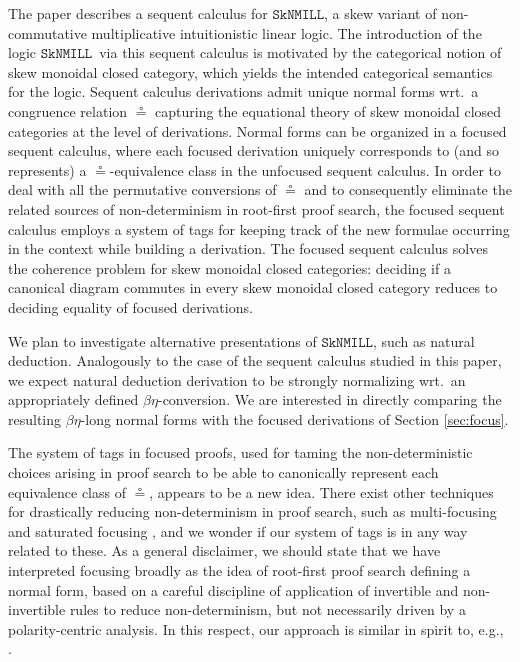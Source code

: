 \documentclass[copyright,creativecommons]{eptcs}
\theoremstyle{definition}
\newcommand{\SkNMILL}{$\mathtt{SkNMILL}$}
\begin{document}
The paper describes a sequent calculus for \SkNMILL, a skew variant of non-commutative multiplicative intuitionistic linear logic. The introduction of the logic \SkNMILL\ via this sequent calculus is motivated by the categorical notion of skew monoidal closed category, which yields the intended categorical semantics for the logic. Sequent calculus derivations admit unique normal forms wrt.\ a congruence relation $\circeq$ capturing the equational theory of skew monoidal closed categories at the level of derivations. Normal forms can be organized in a focused sequent calculus, where each focused derivation uniquely corresponds to (and so represents) a $\circeq$-equivalence class in the unfocused sequent calculus. In order to deal with all the permutative conversions of $\circeq$ and to consequently eliminate the related sources of non-determinism in root-first proof search, the focused sequent calculus employs a system of tags for keeping track of the new formulae occurring in the context while building a derivation. The focused sequent calculus solves the coherence problem for skew monoidal closed categories: deciding if a canonical diagram commutes in every skew monoidal closed category reduces to deciding equality of focused derivations.

We plan to investigate alternative presentations of \SkNMILL, such as natural deduction. Analogously to the case of the sequent calculus studied in this paper, we expect natural deduction derivation to be strongly normalizing wrt.\ an appropriately defined $\beta\!\eta$-conversion. We are interested in directly comparing the resulting $\beta\!\eta$-long normal forms with the focused derivations of Section \ref{sec:focus}.

The system of tags in focused proofs, used for taming the non-deterministic choices arising in proof search to be able to canonically represent each equivalence class of $\circeq$, appears to be a new idea. %
There exist other techniques for drastically reducing non-determinism in proof search, such as multi-focusing \cite{chaudhuri:canonical:2008} and saturated focusing \cite{scherer:simple:2015}, and we wonder if our system of tags is in any way related to these. As a general disclaimer, we should state that we have interpreted focusing broadly as the idea of root-first proof search defining a normal form, based on a careful discipline of application of invertible and non-invertible rules to reduce non-determinism, but not necessarily driven by a polarity-centric analysis. In this respect, our approach is similar in spirit to, e.g., \cite{dyckhoff:ljq}.
\end{document}
